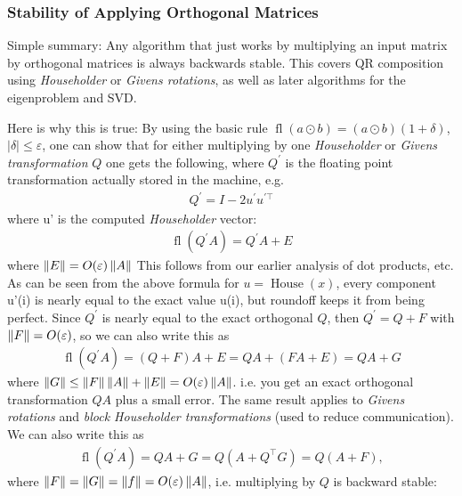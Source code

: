 \documentclass[11pt]{article}
\numberwithin{equation}{section}
\begin{document}
\subsubsection{Stability of Applying Orthogonal Matrices}
Simple summary: Any algorithm that just works by multiplying an input matrix by orthogonal matrices is always backwards stable. 
This covers QR composition using \textit{Householder} or \textit{Givens rotations}, as well as later algorithms for the eigenproblem and SVD.

Here is why this is true: By using the basic rule $\operatorname{fl}(a \odot b) = (a \odot b)(1+\delta)$, $|\delta| \leq \varepsilon$, 
one can show that for either multiplying by one \textit{Householder} or \textit{Givens transformation} $Q$ one gets the following, 
where $Q^\prime$ is the floating point transformation actually stored in the machine, e.g. \begin{align*}
    Q^\prime = I - 2u^\prime u^{\prime \top}
\end{align*}where u' is the computed \textit{Householder} vector: \begin{align*}
    \operatorname{fl}(Q^\prime A) = Q^\prime A+E
\end{align*}
where $\left\| E \right\| = O(\varepsilon) \left\| A \right\|$ This follows from our earlier analysis of dot products, etc. As can be seen from the above formula for $u=\operatorname{House}(x)$, 
every component u'(i) is nearly equal to the exact value u(i), but roundoff keeps it from being perfect. Since $Q^\prime$ is nearly equal to the exact orthogonal $Q$, 
then $Q^\prime=Q+F$ with $\left\| F \right\| = O(\varepsilon)$, so we can also write this as \begin{align*}
    \operatorname{fl}(Q^\prime A) = (Q+F)A + E = QA + (FA + E) = QA + G
\end{align*}
where $\left\| G \right\| \leq \left\| F \right\|\left\| A \right\| + \left\| E \right\| = O(\varepsilon)\left\| A \right\|$. i.e. you get an exact orthogonal transformation $QA$ plus a small error. 
The same result applies to \textit{Givens rotations} and \textit{block Householder transformations} (used to reduce communication).
We can also write this as \begin{align*}
    \operatorname{fl}(Q^\prime A) = QA + G = Q(A+Q^\top G) = Q(A + F),
\end{align*}
where $\left\| F \right\| = \left\| G \right\| = \left\| f \right\|=O(\varepsilon)\left\| A \right\|$, i.e. multiplying by $Q$ is backward stable: 
\end{document}

